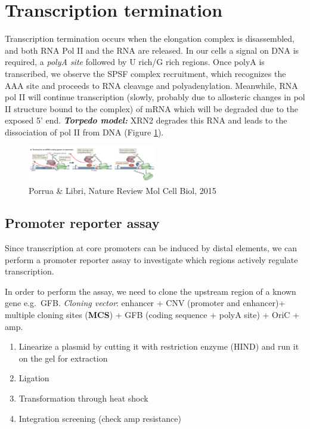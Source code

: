 \hypertarget{termination}{%
\section{Transcription termination}\label{termination}}

Transcription termination occurs when the elongation complex is disassembled, and both RNA Pol II and the RNA are released. In our cells a signal on DNA is required, a \emph{polyA site} followed by U rich/G rich regions. Once polyA is transcribed, we observe the SPSF complex recruitment, which recognizes the AAA site and proceeds to RNA cleavage and polyadenylation. Meanwhile, RNA pol II will continue transcription (slowly, probably due to allosteric changes in pol II structure bound to the complex) of mRNA which will be degraded due to the exposed 5' end. \textbf{\emph{Torpedo model:}} XRN2 degrades this RNA and leads to the dissociation of pol II from DNA (Figure \ref{fig:torpedo}).

\begin{figure}
\centering
\includegraphics[width=0.5\textwidth]{../_resources/Screenshot_2022-10-10_at_10-38-48.png}
\caption{Porrua \& Libri, Nature Review Mol Cell Biol, 2015}
\label{fig:torpedo}
\end{figure}

\hypertarget{promoter-reporter-assay}{%
\subsection{Promoter reporter assay}\label{promoter-reporter-assay}}

Since transcription at core promoters can be induced by distal elements, we can perform a promoter reporter assay to investigate which regions actively regulate transcription.

In order to perform the assay, we need to clone the upstream region of a known gene e.g.~GFB. \emph{Cloning vector}: enhancer + CNV (promoter and enhancer)+ multiple cloning sites (\textbf{MCS}) + GFB (coding sequence + polyA site) + OriC + amp.

\begin{enumerate}
\def\labelenumi{\arabic{enumi}.}
\tightlist
\item
  Linearize a plasmid by cutting it with restriction enzyme (HIND) and run it on the gel for extraction
\item
  Ligation
\item
  Transformation through heat shock
\item
  Integration screening (check amp resistance)
\end{enumerate}

